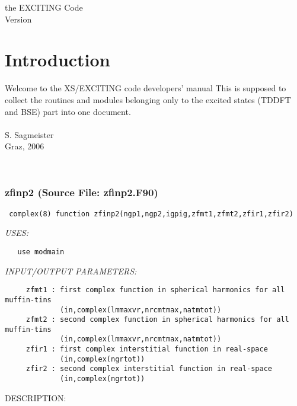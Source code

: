\documentclass[11pt]{article}
\begin{document}

 

     the 
     EXCITING Code \\ Version 
\section{Introduction}

     Welcome to the {\sf XS/EXCITING} code developers' manual
     This is supposed to collect the routines and modules belonging
     only to the excited states (TDDFT and BSE) part into one document.
     \\\\
     S. Sagmeister\\
     Graz, 2006
   
\newpage




 
 
\mbox{}\hrulefill\ 
 
\subsubsection{zfinp2 (Source File: zfinp2.F90)}


\begin{verbatim} complex(8) function zfinp2(ngp1,ngp2,igpig,zfmt1,zfmt2,zfir1,zfir2)\end{verbatim}{\em USES:}
\begin{verbatim}   use modmain\end{verbatim}{\em INPUT/OUTPUT PARAMETERS:}
\begin{verbatim}     zfmt1 : first complex function in spherical harmonics for all muffin-tins
             (in,complex(lmmaxvr,nrcmtmax,natmtot))
     zfmt2 : second complex function in spherical harmonics for all muffin-tins
             (in,complex(lmmaxvr,nrcmtmax,natmtot))
     zfir1 : first complex interstitial function in real-space
             (in,complex(ngrtot))
     zfir2 : second complex interstitial function in real-space
             (in,complex(ngrtot))\end{verbatim}
{\sf DESCRIPTION:\\ }
\end{document}
